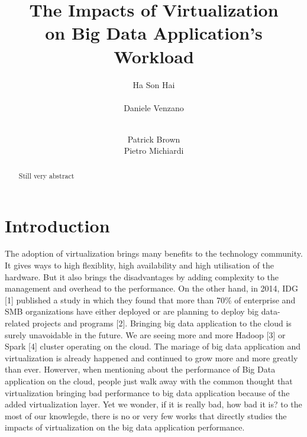 \documentclass{acmsig}
\begin{document}
\title{The Impacts of Virtualization\\ on Big Data Application's Workload}


\author{
\alignauthor
Ha Son Hai\\
       \\
\alignauthor
Daniele Venzano\\
       \\
\and
\alignauthor
Patrick Brown
       \\
\alignauthor
Pietro Michiardi
       \\
}

\maketitle


\begin{abstract}
Still very abstract
\end{abstract}

\section{Introduction}

The adoption of virtualization brings many benefits to the technology community. It gives ways to high flexiblity, high availability and high utilisation of the hardware. But it also brings the disadvantages by adding complexity to the management and overhead to the performance. On the other hand, in 2014, IDG [1] published a study in which they found that more than 70\% of enterprise and SMB organizations have either deployed or are planning to deploy big data-related projects and programs [2]. Bringing big data application to the cloud is surely unavoidable in the future. We are seeing more and more Hadoop [3] or Spark [4] cluster operating on the cloud. The mariage of big data application and virtualization is already happened and continued to grow more and more greatly than ever. Howerver, when mentioning about the performance of Big Data application on the cloud, people just walk away with the common thought that virtualization bringing bad performance to big data application because of the added virtualization layer. Yet we wonder, if it is really bad, how bad it is? to the most of our knowlegde, there is no or very few works that directly studies the impacts of virtualization on the big data application performance.
\end{document}
